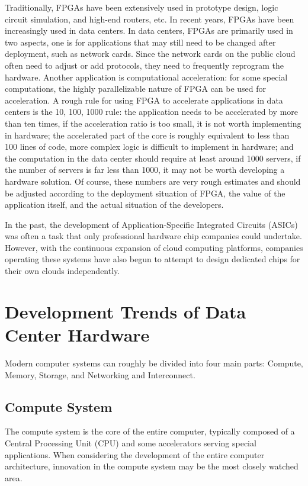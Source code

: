 Traditionally, FPGAs have been extensively used in prototype design, logic circuit simulation, and high-end routers, etc. In recent years, FPGAs have been increasingly used in data centers. In data centers, FPGAs are primarily used in two aspects, one is for applications that may still need to be changed after deployment, such as network cards. Since the network cards on the public cloud often need to adjust or add protocols, they need to frequently reprogram the hardware. Another application is computational acceleration: for some special computations, the highly parallelizable nature of FPGA can be used for acceleration. A rough rule for using FPGA to accelerate applications in data centers is the 10, 100, 1000 rule: the application needs to be accelerated by more than ten times, if the acceleration ratio is too small, it is not worth implementing in hardware; the accelerated part of the core is roughly equivalent to less than 100 lines of code, more complex logic is difficult to implement in hardware; and the computation in the data center should require at least around 1000 servers, if the number of servers is far less than 1000, it may not be worth developing a hardware solution. Of course, these numbers are very rough estimates and should be adjusted according to the deployment situation of FPGA, the value of the application itself, and the actual situation of the developers.

In the past, the development of Application-Specific Integrated Circuits (ASICs) was often a task that only professional hardware chip companies could undertake. However, with the continuous expansion of cloud computing platforms, companies operating these systems have also begun to attempt to design dedicated chips for their own clouds independently.

\fi

\iffalse
\section{Development Trends of Data Center Hardware}
\label{background:sec:hardware}

Modern computer systems can roughly be divided into four main parts: Compute, Memory, Storage, and Networking and Interconnect.

\subsection{Compute System}

The compute system is the core of the entire computer, typically composed of a Central Processing Unit (CPU) and some accelerators serving special applications. When considering the development of the entire computer architecture, innovation in the compute system may be the most closely watched area.

